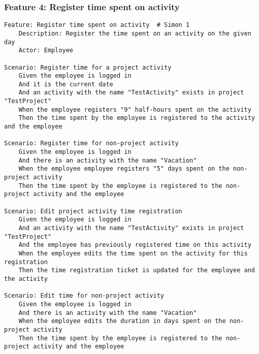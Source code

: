 \subsubsection{Feature 4: Register time spent on activity} 
\begin{lstlisting}
Feature: Register time spent on activity  # Simon 1
    Description: Register the time spent on an activity on the given day
    Actor: Employee

Scenario: Register time for a project activity
    Given the employee is logged in
    And it is the current date
    And an activity with the name "TestActivity" exists in project "TestProject"
    When the employee registers "9" half-hours spent on the activity
    Then the time spent by the employee is registered to the activity and the employee

Scenario: Register time for non-project activity
    Given the employee is logged in
    And there is an activity with the name "Vacation" 
    When the employee employee registers "5" days spent on the non-project activity
    Then the time spent by the employee is registered to the non-project activity and the employee

Scenario: Edit project activity time registration
    Given the employee is logged in
    And an activity with the name "TestActivity" exists in project "TestProject"
    And the employee has previously registered time on this activity
    When the employee edits the time spent on the activity for this registration
    Then the time registration ticket is updated for the employee and the activity

Scenario: Edit time for non-project activity
    Given the employee is logged in
    And there is an activity with the name "Vacation"
    When the employee edits the duration in days spent on the non-project activity
    Then the time spent by the employee is registered to the non-project activity and the employee
\end{lstlisting}


